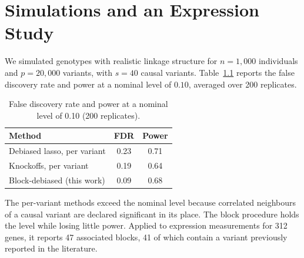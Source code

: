 \chapter{Simulations and an Expression Study}
\label{ch:results}

We simulated genotypes with realistic linkage structure for $n = 1{,}000$ individuals and
$p = 20{,}000$ variants, with $s = 40$ causal variants. Table~\ref{tab:fdr} reports the
false discovery rate and power at a nominal level of $0.10$, averaged over 200 replicates.

\begin{table}[htbp]
  \centering
  \caption{False discovery rate and power at a nominal level of 0.10 (200 replicates).}
  \label{tab:fdr}
  \begin{tabular}{lcc}
    \toprule
    Method & FDR & Power \\
    \midrule
    Debiased lasso, per variant & 0.23 & 0.71 \\
    Knockoffs, per variant      & 0.19 & 0.64 \\
    Block-debiased (this work)  & 0.09 & 0.68 \\
    \bottomrule
  \end{tabular}
\end{table}

The per-variant methods exceed the nominal level because correlated neighbours of a causal
variant are declared significant in its place. The block procedure holds the level while
losing little power. Applied to expression measurements for 312 genes, it reports 47
associated blocks, 41 of which contain a variant previously reported in the literature.
